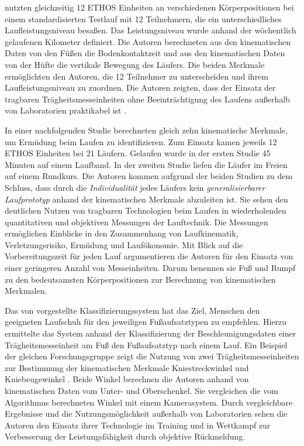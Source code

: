 \citet{Strohrmann2011} nutzten gleichzeitig 12 ETHOS Einheiten an verschiedenen Körperpositionen bei einem standardisierten Testlauf mit 12 Teilnehmern, die ein unterschiedliches Laufleistungsniveau besaßen. Das Leistungsniveau wurde anhand der wöchentlich gelaufenen Kilometer definiert. Die Autoren berechneten aus den kinematischen Daten von den Füßen die Bodenkontaktzeit und aus den kinematischen Daten von der Hüfte die vertikale Bewegung des Läufers. Die beiden Merkmale ermöglichten den Autoren, die 12 Teilnehmer zu unterscheiden und ihrem Laufleistungsniveau zu zuordnen. Die Autoren zeigten, dass der Einsatz der tragbaren Trägheitsmesseinheiten ohne Beeinträchtigung des Laufens außerhalb von Laboratorien praktikabel ist \citep[][]{Strohrmann2011a}.

In einer nachfolgenden Studie berechneten \citet{Strohrmann2012} gleich zehn kinematische Merkmale, um Ermüdung beim Laufen zu identifizieren. Zum Einsatz kamen jeweils 12 ETHOS Einheiten bei 21 Läufern. Gelaufen wurde in der ersten Studie 45 Minuten auf einem Laufband. In der zweiten Studie liefen die Läufer im Freien auf einem Rundkurs. Die Autoren kommen aufgrund der beiden Studien zu dem Schluss, dass durch die \emph{Individualität} jedes Läufers kein \emph{generalisierbarer Laufprototyp} anhand der kinematischen Merkmale abzuleiten ist. Sie sehen den deutlichen Nutzen von tragbaren Technologien beim Laufen in wiederholenden quantitativen und objektiven Messungen der Lauftechnik. Die Messungen ermöglichen Einblicke in den Zusammenhang von Laufkinematik, Verletzungsrisiko, Ermüdung und Laufökonomie. Mit Blick auf die Vorbereitungszeit für jeden Lauf argumentieren die Autoren für den Einsatz von einer geringeren Anzahl von Messeinheiten. Darum benennen sie Fuß und Rumpf zu den bedeutsamsten Körperpositionen zur Berechnung von kinematischen Merkmalen.

Das von \citet{Eskofier2013} vorgestellte Klassifizierungssystem hat das Ziel, Menschen den geeigneten Laufschuh für den jeweiligen Fußaufsatztypen zu empfehlen. Hierzu ermittelte das System anhand der Klassifizierung der Beschleunigungsdaten einer Trägheitsmesseinheit am Fuß den Fußaufsatztyp nach einem Lauf. Ein Beispiel der gleichen Forschungsgruppe zeigt die Nutzung von zwei Trägheitsmesseinheiten zur Bestimmung der kinematischen Merkmale Kniestreckwinkel und Kniebeugewinkel \citep[][]{Jakob2013}. Beide Winkel berechnen die Autoren anhand von kinematischen Daten vom Unter- und Oberschenkel. Sie vergleichen die vom Algorithmus berechneten Winkel mit einem Kamerasystem. Durch vergleichbare Ergebnisse und die Nutzungsmöglichkeit außerhalb von Laboratorien sehen die Autoren den Einsatz ihrer Technologie im Training und in Wettkampf zur Verbesserung der Leistungsfähigkeit durch objektive Rückmeldung.

